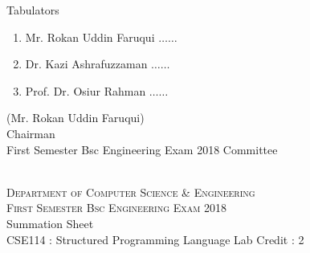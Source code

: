 \documentclass[12pt]{article}
\begin{document}
            \begin{table}[hb]
            	\centering
            \begin{minipage}[b]{0.5\linewidth} %
            {\centering Tabulators }
            \begin{enumerate}
                \item Mr. Rokan Uddin Faruqui \hspace*{1ex} $\ldots \ldots  $  
                \item Dr. Kazi Ashrafuzzaman \hspace*{1ex} $\ldots \ldots  $  
                \item Prof. Dr. Osiur Rahman \hspace*{1ex} $\ldots \ldots $  
            \end{enumerate} 

            \end{minipage}
            \hspace*{1.2cm}
            \begin{minipage}[b]{0.4\linewidth} \centering
            (Mr. Rokan Uddin Faruqui) \\
            Chairman  \hspace*{1ex} \\
           First Semester Bsc Engineering Exam 2018 Committee
            \end{minipage}
            \end{table}
            \clearpage
    \centering
    \begin{minipage}[m]{.8\textwidth} \centering 
	\smallskip
	\\
	\textsc{Department of Computer Science \& Engineering}\\
	\textsc{ First Semester Bsc Engineering Exam 2018}\\
    {\large {\sc Summation Sheet}}\\  
     {\centering CSE114 : Structured Programming Language Lab     Credit : 2 } \\
    \end{minipage} 
\end{document}
